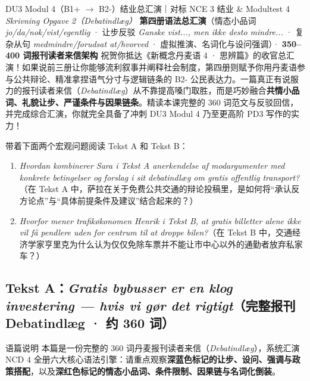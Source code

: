 {DU3 Modul 4（B1+ $\rightarrow$ B2-）结业总汇演｜对标 NCE 3 结业 \& Modultest 4 \textit{Skrivning Opgave 2（Debatindlæg）}}
{\textbf{第四册语法总汇演}（情态小品词 \textit{jo/da/nok/vist/egentlig} · 让步反驳 \textit{Ganske vist..., men ikke desto mindre...} · 复杂从句 \textit{medmindre/forudsat at/hvorved} · 虚拟推演、名词化与设问强调）· \textbf{350--400 词报刊读者来信架构}}
{祝贺你抵达《新概念丹麦语 4 · 思辨篇》的收官总汇演！如果说前三册让你能够流利叙事并阐释社会制度，第四册则赋予你用丹麦语参与公共辩论、精准拿捏语气分寸与逻辑链条的 B2- 公民表达力。一篇真正有说服力的报刊读者来信（\textit{Debatindlæg}）从不靠提高嗓门取胜，而是巧妙融合\textbf{共情小品词、礼貌让步、严谨条件与因果链条}。精读本课完整的 360 词范文与反驳回信，并完成综合汇演，你就完全具备了冲刺 DU3 Modul 4 乃至更高阶 PD3 写作的实力！}

\begin{foerduleaeser}
带着下面两个宏观问题阅读 Tekst A 和 Tekst B：
\begin{enumerate}
  \item \textit{Hvordan kombinerer Sara i Tekst A anerkendelse af modargumenter med konkrete betingelser og forslag i sit debatindlæg om gratis offentlig transport?}（在 Tekst A 中，萨拉在关于免费公共交通的辩论投稿里，是如何将“承认反方论点”与“具体前提条件及建议”结合起来的？）
  \item \textit{Hvorfor mener trafikøkonomen Henrik i Tekst B, at gratis billetter alene ikke vil få pendlere uden for centrum til at droppe bilen?}（在 Tekst B 中，交通经济学家亨里克为什么认为仅仅免除车票并不能让市中心以外的通勤者放弃私家车？）
\end{enumerate}
\end{foerduleaeser}


\subsection*{Tekst A：\textit{Gratis bybusser er en klog investering --- hvis vi gør det rigtigt}（完整报刊 Debatindlæg · 约 360 词）}

\begin{tipbox}{语篇说明}
本篇是一份完整的 360 词丹麦报刊读者来信（\textit{Debatindlæg}），系统汇演 NCD 4 全册六大核心语法引擎：请重点观察\textbf{\color{NCDNavy}深蓝色标记的让步、设问、强调与政策搭配}，以及\textbf{\color{NCDRed}深红色标记的情态小品词、条件限制、因果链与名词化倒装}。
\end{tipbox}

